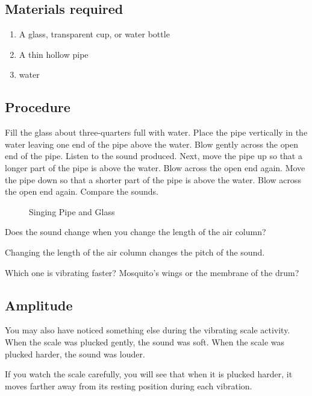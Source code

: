 \documentclass{xtufte-handout}
\begin{document}
\subsection{Materials required}
\begin{enumerate}
  \item A glass, transparent cup, or water bottle
  \item A thin hollow pipe
  \item water
\end{enumerate}
\subsection{Procedure}
Fill the glass about three-quarters full with water. Place the pipe vertically in the water leaving one end of the pipe above the water. Blow gently across the open end of the pipe. Listen to the sound produced. Next, move the pipe up so that a longer part of the pipe is above the water. Blow across the open end again. Move the pipe down so that a shorter part of the pipe is above the water. Blow across the open end again. Compare the sounds.
\begin{figure}
  \caption{Singing Pipe and Glass}
\end{figure}

 Does the sound change when you change the length of the air column?

 Changing the length of the air column changes the pitch of the sound.

 Which one is vibrating faster? Mosquito's wings or the membrane of the drum?

\subsection{Amplitude}
You may also have noticed something else during the vibrating scale activity. When the scale was plucked gently, the sound was soft. When the scale was plucked harder, the sound was louder. 

If you watch the scale carefully, you will see that when it is plucked harder, it moves farther away from its resting position during each vibration.
\end{document}
